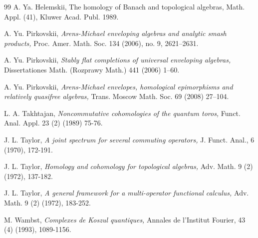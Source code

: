 \documentclass[12pt,reqno]{amsart}%
\theoremstyle{plain}
\numberwithin{theorem}{section} \numberwithin{equation}{section}
\numberwithin{lemma}{section}
\numberwithin{remark}{section}
\numberwithin{example}{section}
\numberwithin{proposition}{section}
\numberwithin{definition}{section}
\numberwithin{corollary}{section}
\begin{document}
\begin{thebibliography}{99}
A. Ya. Helemskii, The homology of Banach and topological
algebras, Math. Appl. (41), Kluwer Acad. Publ. 1989.

A. Yu. Pirkovskii, \textit{Arens-Michael enveloping algebras
and analytic smash products,} Proc. Amer. Math. Soc. 134 (2006), no. 9, 2621--2631.

A. Yu. Pirkovskii, \textit{Stably flat completions of
universal enveloping algebras,} Dissertationes Math. (Rozprawy Math.) 441
(2006) 1--60.

A. Yu. Pirkovskii, \textit{Arens-Michael envelopes, homological
epimorphisms and relatively quasifree algebras, }Trans. Moscow Math. Soc. 69
(2008) 27--104.

L. A. Takhtajan, \textit{Noncommutative cohomologies of the
quantum toros,} Funct. Anal. Appl. 23 (2) (1989) 75-76.

J. L. Taylor, \textit{A joint spectrum for several commuting
operators, }J. Funct. Anal., 6 (1970), 172-191.

J. L. Taylor, \textit{Homology and cohomology for topological
algebras, }Adv. Math. 9 (2) (1972), 137-182.

J. L. Taylor, \textit{A general framework for a multi-operator
functional calculus,} Adv. Math. 9 (2) (1972), 183-252.

M. Wambst, \textit{Complexes de Koszul quantiques,} Annales de
l'Institut Fourier, 43 (4) (1993), 1089-1156.
\end{thebibliography}
\end{document}
